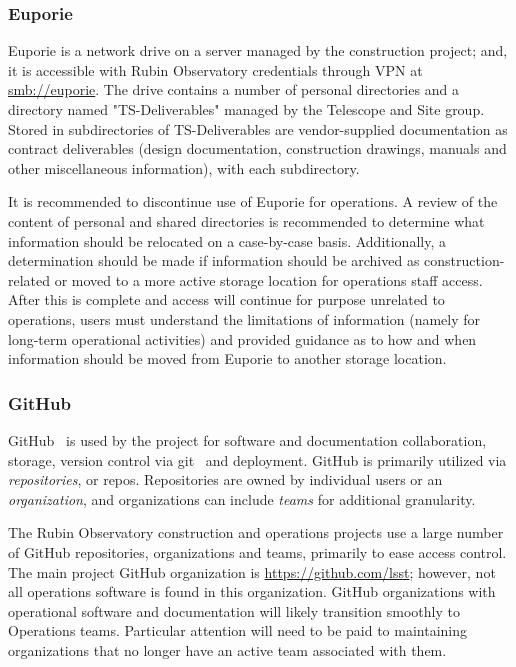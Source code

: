 \subsubsection{Euporie}

Euporie is a network drive on a server managed by the construction project; and, it is accessible with Rubin Observatory credentials through VPN at \url{smb://euporie}.
The drive contains a number of personal directories and a directory named "TS-Deliverables" managed by the Telescope and Site group.
Stored in subdirectories of TS-Deliverables are vendor-supplied documentation as contract deliverables (design documentation, construction drawings, manuals and other miscellaneous information), with each subdirectory.

It is recommended to discontinue use of Euporie for operations.
A review of the content of personal and shared directories is recommended to determine what information should be relocated on a case-by-case basis.
Additionally, a determination should be made if information should be archived as construction-related or moved to a more active storage location for operations staff access.
After this is complete and access will continue for purpose unrelated to operations, users must understand the limitations of information (namely for long-term operational activities) and provided guidance as to how and when information should be moved from Euporie to another storage location.

\subsubsection{GitHub}

GitHub\texttrademark\ \citep{GitHub-cite} is used by the project for software and documentation collaboration, storage, version control via git\texttrademark\ \citep{git-cite} and deployment.
GitHub is primarily utilized via \emph{repositories}, or repos.
Repositories are owned by individual users or an \emph{organization}, and organizations can include \emph{teams} for additional granularity.

The Rubin Observatory construction and operations projects use a large number of GitHub repositories, organizations and teams, primarily to ease access control.
The main project GitHub organization is \url{https://github.com/lsst}; however, not all operations software is found in this organization.
GitHub organizations with operational software and documentation will likely transition smoothly to Operations teams.
Particular attention will need to be paid to maintaining organizations that no longer have an active team associated with them.

